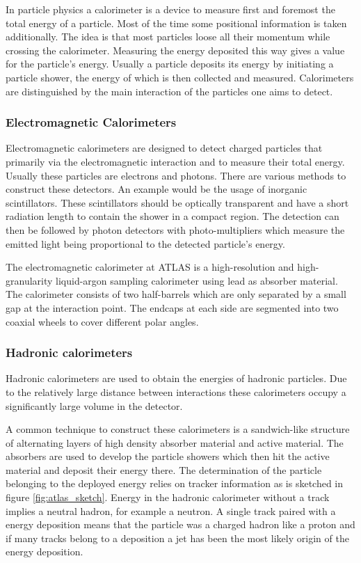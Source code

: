 In particle physics a calorimeter is a device to measure first and foremost the total energy of a particle. Most of the time some positional information is taken  additionally.
The idea is that most particles loose all their momentum while crossing the calorimeter. Measuring the energy deposited this way gives a value for the particle's energy.
Usually a particle deposits its energy by initiating a particle shower, the energy of which is then collected and measured.
Calorimeters are distinguished by the main interaction of the particles one aims to detect. 
\subsubsection{Electromagnetic Calorimeters}

Electromagnetic calorimeters are designed to detect charged particles that primarily via the electromagnetic interaction and to measure their total energy. Usually these particles are electrons and photons. There are various methods to construct these detectors. An example would be the usage of inorganic scintillators. These scintillators should be optically transparent and have a short radiation length to contain the shower in a compact region. The detection can then be followed by photon detectors with photo-multipliers which measure the emitted light being proportional to the detected particle's energy.

The electromagnetic calorimeter at ATLAS is a high-resolution and high-granularity liquid-argon sampling calorimeter using lead as absorber material. The calorimeter consists of two half-barrels which are only separated by a small gap at the interaction point. The endcaps at each side are segmented into two coaxial wheels to cover different polar angles.

\subsubsection{Hadronic calorimeters}

Hadronic calorimeters are used to obtain the energies of hadronic particles.
Due to the relatively large distance between interactions these calorimeters occupy a significantly large volume in the detector.

A common technique to construct these calorimeters is a sandwich-like structure of alternating layers of high density absorber material and active material. 
The absorbers are used to develop the particle showers which then hit the active material and deposit their energy there. The determination of the particle belonging to the deployed energy relies on tracker information as is sketched in figure \ref{fig:atlas_sketch}. Energy in the hadronic calorimeter without a track implies a neutral hadron, for example a neutron. A single track paired with a energy deposition means that the particle was a charged hadron like a proton and if many tracks belong to a deposition a jet has been the most likely origin of the energy deposition.


